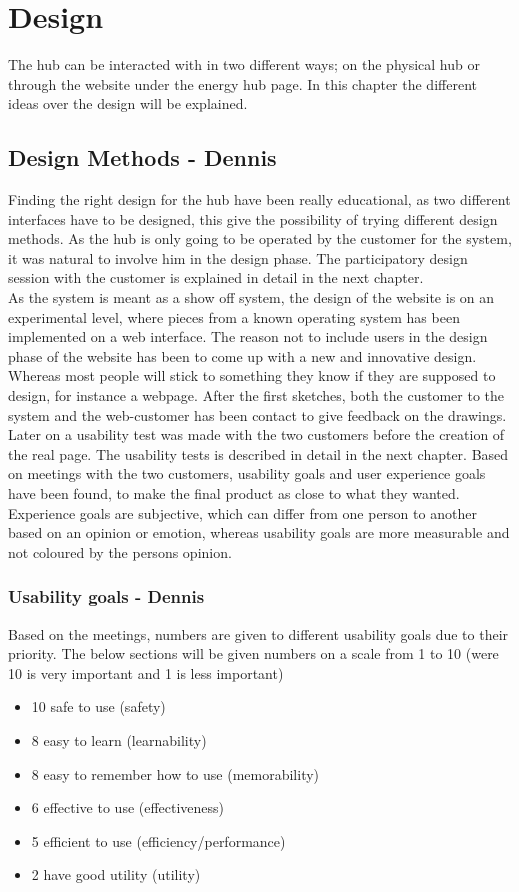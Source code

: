 \chapter{Design}
The hub can be interacted with in two different ways; on the physical hub or through the website under the energy hub page. In this chapter the different ideas over the design will be explained.
\section{Design Methods - Dennis}
Finding the right design for the hub have been really educational, as two different interfaces have to be designed, this give the possibility of trying different design methods. As the hub is only going to be operated by the customer for the system, it was natural to involve him in the design phase. The participatory design session with the customer is explained in detail in the next chapter.
\\As the system is meant as a show off system, the design of the website is on an experimental level, where pieces from a known operating system has been implemented on a web interface. The reason not to include users in the design phase of the website has been to come up with a new and innovative design. Whereas most people will stick to something they know if they are supposed to design, for instance a webpage. After the first sketches, both the customer to the system and the web-customer has been contact to give feedback on the drawings. Later on a usability test was made with the two customers before the creation of the real page. The usability tests is described in detail in the next chapter.
\p
Based on meetings with the two customers, usability goals and user experience goals have been found, to make the final product as close to what they wanted. Experience goals are subjective, which can differ from one person to another based on an opinion or emotion, whereas usability goals are more measurable and not coloured by the persons opinion.
\subsection{Usability goals - Dennis}
Based on the meetings, numbers are given to different usability goals due to their priority. 
The below sections will be given numbers on a scale from 1 to 10 (were 10 is very important and 1 is less important)
\begin{itemize}
	\item 10 safe to use (safety)
	\item 8 easy to learn (learnability) 
	\item 8 easy to remember how to use (memorability)
	\item 6 effective to use (effectiveness) 
	\item 5 efficient to use (efficiency/performance)
	\item 2 have good utility (utility)	
\end{itemize}
